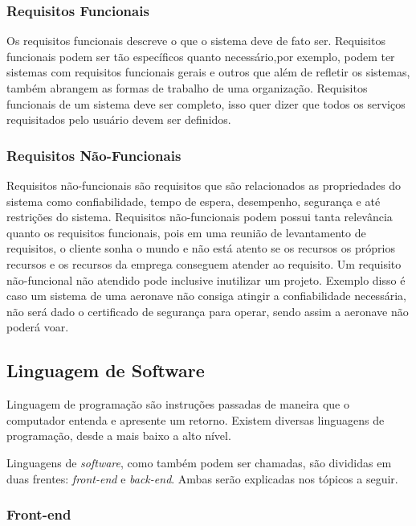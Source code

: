 \subsubsection{Requisitos Funcionais}
\label{sec:requisitos_funcionais}

Os requisitos funcionais descreve o que o sistema deve de fato ser. Requisitos funcionais podem ser tão específicos quanto necessário,por exemplo, podem ter sistemas com requisitos funcionais gerais e outros que além de refletir os sistemas, também abrangem as formas de trabalho de uma organização. Requisitos funcionais de um sistema deve ser completo, isso quer dizer que todos os serviços requisitados pelo usuário devem ser definidos.

\subsubsection{Requisitos Não-Funcionais}
\label{sec:requisitos_nao_funcionais}

Requisitos não-funcionais são requisitos que são relacionados as propriedades do sistema como confiabilidade, tempo de espera, desempenho, segurança e até restrições do sistema. Requisitos não-funcionais podem possui tanta relevância quanto os requisitos funcionais, pois em uma reunião de levantamento de requisitos, o cliente sonha o mundo e não está atento se os recursos os próprios recursos e os recursos da emprega conseguem atender ao requisito. Um requisito não-funcional não atendido pode inclusive inutilizar um projeto. Exemplo disso é caso um sistema de uma aeronave não consiga atingir a confiabilidade necessária, não será dado o certificado de segurança para operar, sendo assim a aeronave não poderá voar.

\subsection{Linguagem de Software}

Linguagem de programação são instruções passadas de maneira que o computador entenda e apresente um retorno. Existem diversas linguagens de programação, desde a mais baixo a alto nível.

Linguagens de \textit{software}, como também podem ser chamadas, são divididas em duas frentes: \textit{front-end} e \textit{back-end}. Ambas serão explicadas nos tópicos a seguir.

\subsubsection{Front-end}
\label{sec:front-end}

